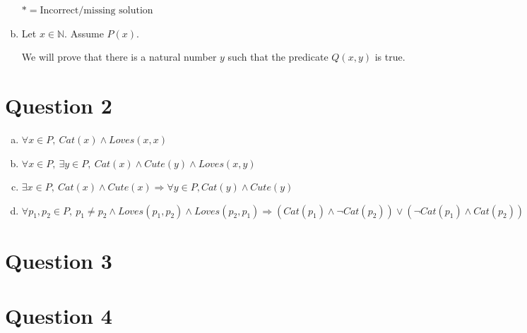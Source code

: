 \documentclass[12pt]{article}
\begin{document}
\begin{enumerate}[a.]
    $* = \text{Incorrect/missing solution}$

    \item

    Let $x \in \mathbb{N}$. Assume $P(x)$.

    \bigskip

    We will prove that there is a natural number $y$ such that the predicate
    $Q(x,y)$ is true.

\end{enumerate}

\section*{Question 2}
\begin{enumerate}[a.]
    \item

    $\forall x \in P,\:Cat(x) \land Loves(x,x)$

    \item

    $\forall x \in P,\: \exists y \in P,\: Cat(x) \land Cute(y) \land Loves(x,y)$

    \item

    $\exists x \in P,\: Cat(x) \land Cute(x) \Rightarrow \forall y \in P, Cat(y)
    \land Cute(y)$

    \item

    $\forall p_1,p_2 \in P,\:p_1 \neq p_2 \land Loves(p_1,p_2) \land Loves(p_2,p_1)
    \Rightarrow (Cat(p_1) \land \neg Cat(p_2)) \lor (\neg Cat(p_1) \land Cat(p_2))$

\end{enumerate}

\section*{Question 3}

\section*{Question 4}
\end{document}
